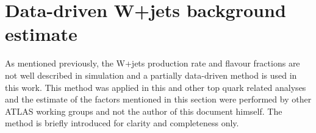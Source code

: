 %
%
%

\section{Data-driven W+jets background estimate}
\label{sec:ttjets_wjets}

As mentioned previously, the W+jets production rate and flavour fractions are not well described in simulation and a partially data-driven method is used in this work.
This method was applied in this and other top quark related analyses and the estimate of the factors mentioned in this section were performed by other ATLAS working
groups and not the author of this
document himself. The method is briefly introduced for clarity and completeness only.


